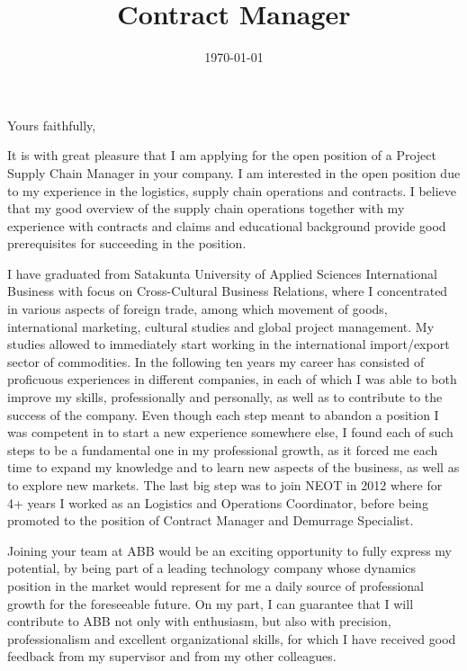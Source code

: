 \documentclass[11pt,a4paper,sans]{moderncv}        %
\title{Contract Manager}                               %
\begin{document}
\date{\today}
\closing{Yours faithfully,}
\makelettertitle

\hspace*{-5cm}

It is with great pleasure that I am applying for the open position of a Project Supply Chain Manager in your company.
I am interested in the open position due to my experience in the logistics, supply chain operations and contracts. I
believe that my good overview of the supply chain operations together with my experience with contracts and claims and
educational background provide good prerequisites for succeeding in the position.
 
 
I have graduated from Satakunta University of Applied Sciences International Business with focus on
Cross-Cultural Business Relations, where I concentrated in various aspects of foreign trade, among which  movement of goods, international marketing, cultural studies and
global project management. My studies allowed to immediately start working in the international import/export sector
of commodities. In the following ten years my career has consisted of proficuous experiences in different companies, in each of which
I was able to both improve my skills, professionally and personally, as well as to contribute to the success of the company. Even though
each step meant to abandon a position I was competent in to start a new experience somewhere else, I found each of such steps to be a fundamental
one in my professional growth, as it forced me each time to expand my knowledge and to learn new aspects of the business, as well as to
explore new markets. The last big step was to join NEOT in 2012 where for 4+ years I worked as an Logistics
and Operations Coordinator, before being promoted to the position of Contract Manager and Demurrage Specialist.
 
Joining your team at ABB would be an exciting opportunity to fully express my potential, by being
part of a leading technology company whose dynamics position in the market would represent for me a daily source of professional
growth for the foreseeable future.
On my part, I can guarantee that I will contribute to ABB not only with enthusiasm, but also with precision, professionalism
and excellent organizational skills, for which I have received good feedback from my supervisor and from my other
colleagues.
\\

\makeletterclosing
\end{document}
